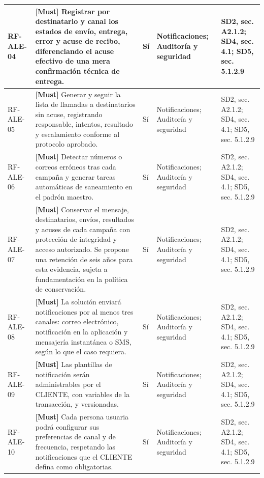 \begin{paginaHorizontalSynaptix}
\begin{longtable}{|L{0.09\AnchoMatrizTDoce}|L{0.385\AnchoMatrizTDoce}|L{0.065\AnchoMatrizTDoce}|L{0.18\AnchoMatrizTDoce}|L{0.28\AnchoMatrizTDoce}|}
RF-\allowbreak{}ALE-\allowbreak{}04 &
\textbf{[Must]} Registrar por destinatario y canal los estados de envío, entrega, error y acuse de recibo, diferenciando el acuse efectivo de una mera confirmación técnica de entrega. &
Sí &
Notificaciones; Auditoría y seguridad &
SD2, sec. A2.1.2; SD4, sec. 4.1; SD5, sec. 5.1.2.9 \\ \hline

RF-\allowbreak{}ALE-\allowbreak{}05 &
\textbf{[Must]} Generar y seguir la lista de llamadas a destinatarios sin acuse, registrando responsable, intentos, resultado y escalamiento conforme al protocolo aprobado. &
Sí &
Notificaciones; Auditoría y seguridad &
SD2, sec. A2.1.2; SD4, sec. 4.1; SD5, sec. 5.1.2.9 \\ \hline

RF-\allowbreak{}ALE-\allowbreak{}06 &
\textbf{[Must]} Detectar números o correos erróneos tras cada campaña y generar tareas automáticas de saneamiento en el padrón maestro. &
Sí &
Notificaciones; Auditoría y seguridad &
SD2, sec. A2.1.2; SD4, sec. 4.1; SD5, sec. 5.1.2.9 \\ \hline

RF-\allowbreak{}ALE-\allowbreak{}07 &
\textbf{[Must]} Conservar el mensaje, destinatarios, envíos, resultados y acuses de cada campaña con protección de integridad y acceso autorizado. Se propone una retención de seis años para esta evidencia, sujeta a fundamentación en la política de conservación. &
Sí &
Notificaciones; Auditoría y seguridad &
SD2, sec. A2.1.2; SD4, sec. 4.1; SD5, sec. 5.1.2.9 \\ \hline

RF-\allowbreak{}ALE-\allowbreak{}08 &
\textbf{[Must]} La solución enviará notificaciones por al menos tres canales: correo electrónico, notificación en la aplicación y mensajería instantánea o SMS, según lo que el caso requiera. &
Sí &
Notificaciones; Auditoría y seguridad &
SD2, sec. A2.1.2; SD4, sec. 4.1; SD5, sec. 5.1.2.9 \\ \hline

RF-\allowbreak{}ALE-\allowbreak{}09 &
\textbf{[Must]} Las plantillas de notificación serán administrables por el CLIENTE, con variables de la transacción, y versionadas. &
Sí &
Notificaciones; Auditoría y seguridad &
SD2, sec. A2.1.2; SD4, sec. 4.1; SD5, sec. 5.1.2.9 \\ \hline

RF-\allowbreak{}ALE-\allowbreak{}10 &
\textbf{[Must]} Cada persona usuaria podrá configurar sus preferencias de canal y de frecuencia, respetando las notificaciones que el CLIENTE defina como obligatorias. &
Sí &
Notificaciones; Auditoría y seguridad &
SD2, sec. A2.1.2; SD4, sec. 4.1; SD5, sec. 5.1.2.9 \\ \hline


\end{longtable}
\end{paginaHorizontalSynaptix}
